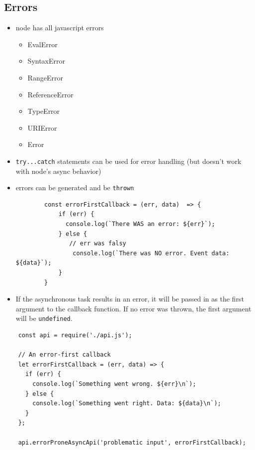 \documentclass[12pt]{article}
\begin{document}
\subsection{Errors}
\begin{itemize}
    \item node has all javascript errors
    \begin{itemize}
        \item EvalError
        \item SyntaxError
        \item RangeError
        \item ReferenceError
        \item TypeError
        \item URIError
        \item Error
    \end{itemize}
    \item \texttt{try...catch} statements can be used for error handling (but doesn't work with node's async behavior)
    \item errors can be generated and be \texttt{thrown}

    \begin{lstlisting}
        const errorFirstCallback = (err, data)  => {
            if (err) {
              console.log(`There WAS an error: ${err}`);
            } else {
               // err was falsy
                console.log(`There was NO error. Event data: ${data}`);
            }
        }
    \end{lstlisting}

    \item If the asynchronous task results in an error, it will be passed in as
    the first argument to the callback function. If no error was thrown, the
    first argument will be \texttt{undefined}.
\end{itemize}

\begin{lstlisting}
    const api = require('./api.js');

    // An error-first callback
    let errorFirstCallback = (err, data) => {
      if (err) {
        console.log(`Something went wrong. ${err}\n`);
      } else {
        console.log(`Something went right. Data: ${data}\n`);
      }
    };

    api.errorProneAsyncApi('problematic input', errorFirstCallback);
\end{lstlisting}
\end{document}
